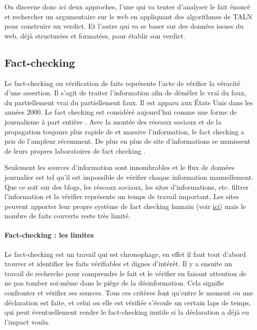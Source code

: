 On discerne donc ici deux approches, l'une qui va tenter d'analyser le fait énoncé et rechercher un argumentaire sur le web en appliquant des algorithmes de TALN pour construire un verdict. Et l'autre qui va se baser sur des données issues du web, déjà structurées et formatées, pour établir son verdict.

\subsection{Fact-checking}

Le fact-checking ou vérification de faits représente l'acte de vérifier la véracité d'une assertion. Il s'agit de traiter l'information afin de démêler le vrai du faux, du partiellement vrai du partiellement faux. Il est apparu aux États Unis dans les années 2000. Le fact checking est considéré aujourd'hui comme une forme de journalisme à part entière \cite{lemonde_fact_check_nouveaute_journalistique}. Avec la montée des réseaux sociaux et de la propagation toujours plus rapide de et massive l'information, le fact checking a pris de l'ampleur récemment. De plus en plus de site d'informations se munissent de leurs propres laboratoires de fact checking \cite{memoire_fact_check_nouveaute_journalistique}. 

Seulement les sources d'information sont innombrables et le flux de données journalier est tel qu'il est impossible de vérifier chaque information manuellement. Que ce soit sur des blogs, les réseaux sociaux, les sites d'informations, etc. filtrer l'information et la vérifier représente un temps de travail important. Les sites peuvent apporter leur propre système de fact checking humain (voir \href{http://decodeurs.blog.lemonde.fr/}{ici}) mais le nombre de faits couverts reste très limité.

\paragraph{Fact-checking : les limites}

Le fact-checking est un travail qui est chronophage, en effet il faut tout d'abord trouver et identifier les faits vérifiables et dignes d'intérêt. Il y a ensuite un travail de recherche pour comprendre le fait et le vérifier en faisant attention de ne pas tomber soi-même dans le piège de la désinformation. Cela signifie confronter et vérifier ses sources. 
Tous ces critères font qu'entre le moment ou une déclaration est faite, et celui ou elle est vérifiée s'écoule un certain laps de temps, qui peut éventuellement rendre le fact-checking inutile si la déclaration a déjà eu l'impact voulu.

